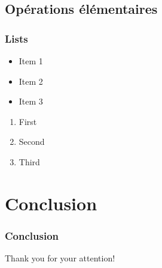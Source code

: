 \documentclass{beamer}
\begin{document}
\subsection{Opérations élémentaires}
\begin{frame}
\frametitle{Lists}
\begin{itemize}
    \item Item 1
    \item Item 2
    \item Item 3
\end{itemize}

\begin{enumerate}
    \item First
    \item Second
    \item Third
\end{enumerate}
\end{frame}

\section{Conclusion}
\begin{frame}
\frametitle{Conclusion}
Thank you for your attention!
\end{frame}
\end{document}
